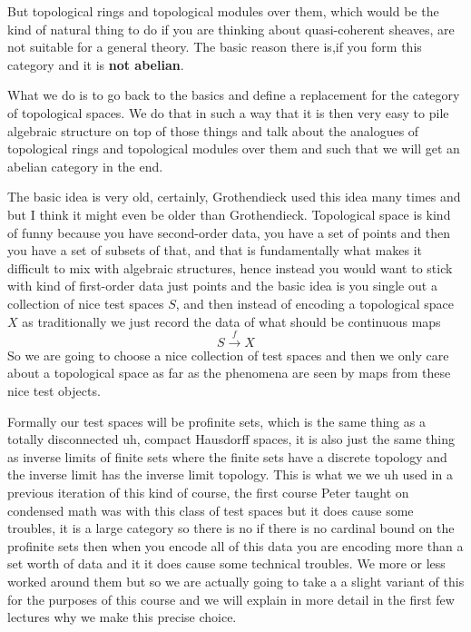 But topological rings and topological modules over them, which would be the kind of natural thing to do if you are thinking about 
quasi-coherent sheaves, are not suitable for a general theory. The basic reason there is,if you form this category and it is 
\textbf{not abelian}.


What we do is to go back to the basics and define a replacement for the category of topological spaces. We do that in such a way 
that it is then very easy to pile algebraic structure on top of those things and talk about the analogues of topological rings 
and topological modules over them and such that we will get an abelian category in the end.


The basic idea is very old, certainly, Grothendieck used this idea many times and but I think it might even be older than 
Grothendieck. Topological space is kind of funny because you have second-order data, you have a set of points and then you have a 
set of subsets of that, and that is fundamentally what makes it difficult to mix with algebraic structures, hence instead you 
would want to stick with kind of first-order data just points and the basic idea is you single out a collection of nice 
test spaces $S$, and then instead of encoding a topological space $X$ as traditionally we just record the data of what 
should be continuous maps 
  $$ S \xrightarrow{f} X$$
So we are going to choose a nice collection of test spaces and then we only care about a topological space as far as the phenomena 
are seen by maps from these nice test objects.  


Formally our test spaces will be profinite sets, which is the same thing as a totally disconnected uh, compact Hausdorff spaces, 
it is also just the same thing as inverse limits of finite sets where the finite sets have a discrete topology and the inverse 
limit has the inverse limit topology. This is what we we uh used in a previous iteration of this kind of course, the first course 
Peter taught on condensed math was with this class of test spaces but it does cause some troubles, it is a large category so there 
is no if there is no cardinal bound on the profinite sets then when you encode all of this data you are encoding more than a set 
worth of data and it it does cause some technical troubles. We more or less worked around them but so we are actually going to 
take a a slight variant of this for the purposes of this course and we will explain in more detail in the first few lectures why 
we make this precise choice.

